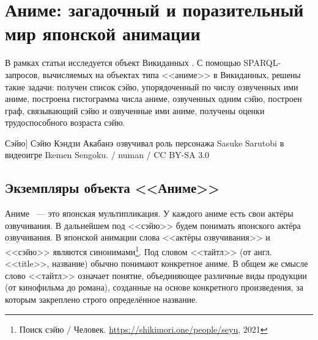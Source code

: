 
\chapter{Аниме: загадочный и поразительный мир японской анимации}


В рамках статьи исследуется объект Викиданных . С помощью SPARQL-запросов, вычисляемых на объектах типа <<аниме>> в Викиданных, решены такие задачи: получен список сэйю, упорядоченный по числу озвученных ими аниме, построена гистограмма числа аниме, озвученных одним сэйю, построен граф, связывающий сэйю и озвученные ими аниме, получены оценки трудоспособного возраста сэйю. 

\begin{marginfigure}[0.0cm]
{
	\setlength{\fboxsep}{0pt}%
	\setlength{\fboxrule}{1pt}%
}
\caption
[Сэйю]
{
Сэйю Кэндзи Акабанэ озвучивал роль персонажа Sasuke Sarutobi в видеоигре Ikemen Sengoku. / numan / CC BY-SA 3.0
}
\label{fig:seyu}
\end{marginfigure}

\label{ch:anime}

\section{Экземпляры объекта <<Аниме>>}

Аниме ~--- это японская мультипликация. У каждого аниме есть свои актёры озвучивания. В дальнейшем под <<сэйю>> будем понимать японского актёра озвучивания. В японской анимации слова <<актёры озвучивания>> и <<сэйю>> являются синонимами\footnote{Поиск сэйю / Человек. \href{https://
shikimori.one/people/seyu}{https://shikimori.one/people/seyu}, 2021}. Под словом <<тайтл>> (от англ. <<title>>, название) обычно понимают конкретное аниме\cite{anime_social}. В общем же смысле слово <<тайтл>> означает понятие, объединяющее различные виды продукции (от кинофильма до романа), созданные на основе конкретного произведения, за которым закреплено строго определённое название\cite{anime_title_def}.

